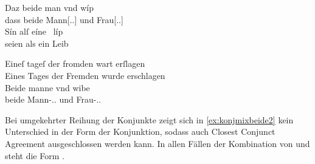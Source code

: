 \begin{exe}
\ex \label{ex:konjmixbeide1}
	\begin{xlist}
	\ex \gll Daz beide man vnd wíp \\
			dass beide Mann[\Nom.\Sg.\MascM] und Frau[\Nom.\Sg.\NeutF{}] \\
	\sn \gll Sín alſ eíne~ líp \\
			seien als ein Leib \\
		\begin{taggedline}{\parencites[\pno~45vb,12--13]{kc:VB}[vgl.][9536--9537]{schroeder1895}}
		\trans {}
		\end{taggedline}
		\label{ex:konjmixbeide1_1}

	\ex \label{ex:konjmixbeide1_2}
		\gll Eineſ tageſ der fromden wart erſlagen \\
			Eines Tages der Fremden wurde erschlagen \\
		\textelp{}
	\sn \gll Beide manne vnd wibe \\
			beide Mann-\Nom.\Pl.\MascM{} und Frau-\Nom.\Pl.\NeutF{} \\
		\begin{taggedline}{\parencites[\pno~3vb,11--14]{kc:VB}[vgl.][625--628]{schroeder1895}}
		\trans {}
		\end{taggedline}
	\end{xlist}
\end{exe}

Bei umgekehrter Reihung der Konjunkte zeigt sich in \cref{ex:konjmixbeide2}
kein Unterschied in der Form der Konjunktion, sodass auch Closest Conjunct
Agreement ausgeschlossen werden kann. In allen Fällen der Kombination von
  und   steht die
Form .

